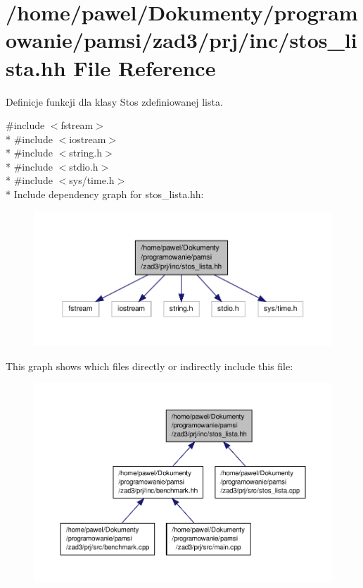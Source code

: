 \hypertarget{stos__lista_8hh}{\section{/home/pawel/\-Dokumenty/programowanie/pamsi/zad3/prj/inc/stos\-\_\-lista.hh File Reference}
\label{stos__lista_8hh}
}


Definicje funkcji dla klasy Stos zdefiniowanej lista.  


{\ttfamily \#include $<$fstream$>$}\\*
{\ttfamily \#include $<$iostream$>$}\\*
{\ttfamily \#include $<$string.\-h$>$}\\*
{\ttfamily \#include $<$stdio.\-h$>$}\\*
{\ttfamily \#include $<$sys/time.\-h$>$}\\*
Include dependency graph for stos\-\_\-lista.\-hh\-:\nopagebreak
\begin{figure}[H]
\begin{center}
\leavevmode
\includegraphics[width=350pt]{stos__lista_8hh__incl}
\end{center}
\end{figure}
This graph shows which files directly or indirectly include this file\-:\nopagebreak
\begin{figure}[H]
\begin{center}
\leavevmode
\includegraphics[width=350pt]{stos__lista_8hh__dep__incl}
\end{center}
\end{figure}
